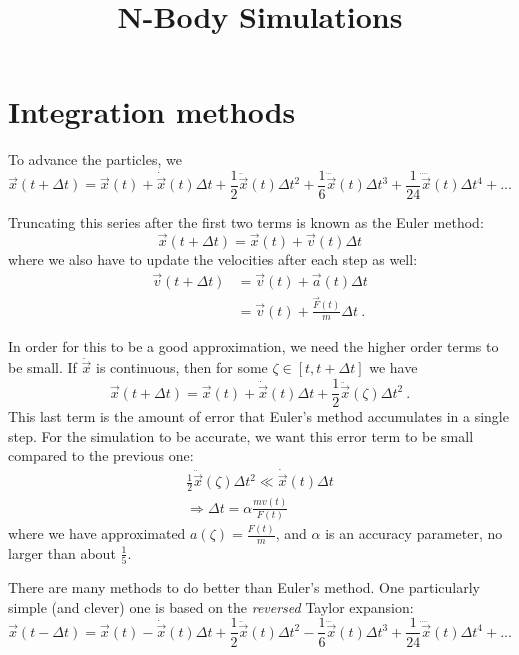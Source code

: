 \documentclass[11pt]{article}
\title{\bf\Huge N-Body Simulations}
\author{}
\date{}
\def\be{\begin{equation}}
\def\ee{\end{equation}}
\renewcommand\({\left(}
\renewcommand\){\right)}
\renewcommand\[{\left[}
\renewcommand\]{\right]}
\def\be{\begin{equation}}
\def\ee{\end{equation}}
\begin{document}
\maketitle


\section{Integration methods}
To advance the particles, we 
\be
\vec x( t + \Delta t ) = \vec x(t) + \dot{ \vec x}(t) \Delta t + \frac{1}{2}\ddot{ \vec x}(t) \Delta t^2
 +  \frac{1}{6}\dddot{ \vec x}(t) \Delta t^3  +  \frac{1}{24}\ddddot{ \vec x}(t) \Delta t^4 + ...
 \label{taylorexp}
\ee

Truncating this series after the first two terms is known as the Euler method:
\be
\vec x( t + \Delta t ) = \vec x(t) + \vec v(t) \Delta t 
\ee
where we also have to update the velocities after each step as well:
\begin{align} \nonumber
\vec v( t + \Delta t ) &= \vec v(t) + \vec a(t) \Delta t  \\
&= \vec v(t) + \frac{ \vec F(t)}{m} \Delta t ~.
\end{align}

In order for this to be a good approximation, we need the higher order terms to be small.  If $\ddot{ \vec x }$ is continuous, then for some $\zeta \in [t, t + \Delta t]$ we have 
\be
\vec x( t + \Delta t ) = \vec x(t) + \dot{ \vec x}(t) \Delta t + \frac{1}{2}\ddot{ \vec x}(\zeta) \Delta t^2 ~.
\ee
This last term is the amount of error that Euler's method accumulates in a single step.  For the simulation to be accurate, we want this error term to be small compared to the previous one:
\begin{align}
 \frac{1}{2}\ddot{ \vec x}(\zeta) \Delta t^2 \ll \dot{ \vec x}(t) \Delta t \\
 \Rightarrow \Delta t = \alpha \frac{ m v(t)}{F(t)}
\end{align}
where we have approximated $a(\zeta) = \frac{F(t)}{m}$, and $\alpha$ is an accuracy parameter, no larger than about $\frac{1}{5}$.

There are many methods to do better than Euler's method.  One particularly simple (and clever) one is based on the {\it reversed} Taylor expansion:
\be
\vec x( t - \Delta t ) = \vec x(t) - \dot{ \vec x}(t) \Delta t + \frac{1}{2}\ddot{ \vec x}(t) \Delta t^2
 -  \frac{1}{6}\dddot{ \vec x}(t) \Delta t^3  +  \frac{1}{24}\ddddot{ \vec x}(t) \Delta t^4 + ...
\ee
\end{document}
